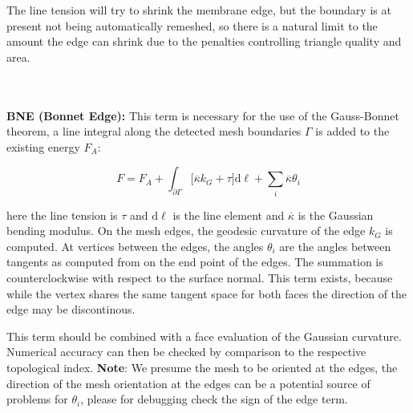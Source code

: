 \documentclass[11pt]{article}
\begin{document}
\begin{tcolorbox}[colback=orange!5!white,colframe=orange!75!black,title=Clarification]
   The line tension will try to shrink the membrane edge, but the boundary is at present not being automatically remeshed, so there is a natural limit to the amount the edge can shrink due to the penalties controlling triangle quality and area. 
\end{tcolorbox}

\noindent \\
\vspace{0.2 cm} \\
\textbf{BNE (Bonnet Edge):} 
This term is necessary for the use of the Gauss-Bonnet theorem, a line integral along the detected mesh boundaries $\Gamma$ is added to the existing energy $F_A$:

\begin{equation}
    F = F_A + \int_{\partial \Gamma} \big[ \overline{\kappa}k_G + \tau \big] \mathrm{d} \ell + \sum_i \overline{\kappa}\theta_i
\end{equation}

here the line tension is $\tau$ and $\mathrm{d} \ell$ is the line element and $\overline{\kappa}$ is the Gaussian bending modulus. On the mesh edges, the geodesic curvature of the edge $k_G$ is computed. At vertices between the edges, the angles $\theta_i$ are the angles between tangents as computed from on the end point of the edges. The summation is counterclockwise with respect to the surface normal. This term exists, because while the vertex shares the same tangent space for both faces the direction of the edge may be discontinous.

\begin{tcolorbox}[colback=orange!5!white,colframe=orange!75!black,title=Clarification]
 This term should be combined with a face evaluation of the Gaussian curvature. Numerical accuracy can then be checked by comparison to the respective topological index. \textbf{Note}: We presume the mesh to be oriented at the edges, the direction of the mesh orientation at the edges can be a potential source of problems for $\theta_i$, please for debugging check the sign of the edge term.
\end{tcolorbox}


\end{document}
